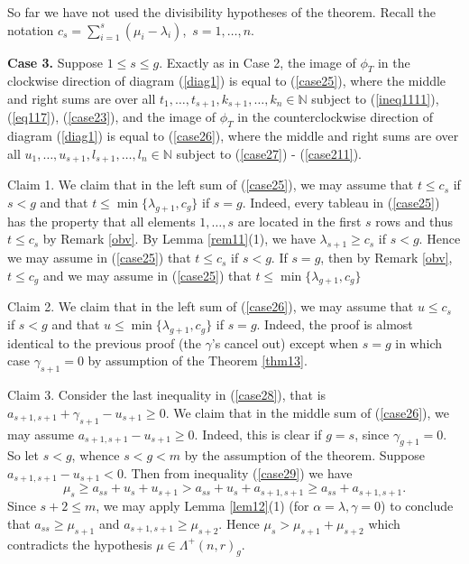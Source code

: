 \documentclass[ALCO,Unicode]{cedram}
\newcommand{\la}{\lambda}
\newcommand{\La}{\Lambda}
\numberwithin{equation}{section}
\begin{document}
So far we have not used the divisibility hypotheses of the theorem. Recall the notation $c_s= \sum_{i=1}^{s}(\mu_i - \lambda_i)$,\ $s=1,\dots,n$.

\textbf{Case 3.} Suppose $1 \le s \le g.$ Exactly as in Case 2, the image of $\phi_T$ in the clockwise direction of diagram (\ref{diag1}) is equal to (\ref{case25}), where the middle and right sums are over all  $t_1,\dots,t_{s+1},k_{s+1},\dots,k_n \in \mathbb{N}$ subject to (\ref{ineq1111}), (\ref{eq117}), (\ref{case23}), and the image of $\phi_T$ in the counterclockwise direction of diagram (\ref{diag1}) is equal to (\ref{case26}), where the middle and right sums are over all  $u_1,\dots,u_{s+1},l_{s+1},\dots,l_n \in \mathbb{N}$ subject to (\ref{case27}) - (\ref{case211}).

Claim 1. We claim that in the left sum of (\ref{case25}), we may assume that $t \le c_s$ if $s<g$ and that $t \le \min\{\lambda_{g+1}, c_g\}$ if $s=g$. Indeed, every tableau in  (\ref{case25}) has the property that all elements $1,\dots,s$ are located in the first $s$ rows and thus $t \le c_s$ by Remark \ref{obv}. By Lemma \ref{rem11}(1), we have $\la_{s+1} \ge c_s$ if $s<g$. Hence we may assume in (\ref{case25}) that $t \le c_s$ if $s<g$. If $s=g$, then by Remark \ref{obv}, $t \le c_g$ and we may assume in (\ref{case25}) that $t \le \min\{\lambda_{g+1}, c_g\}$

Claim 2. We claim that in the left sum of (\ref{case26}), we may assume that $u \le c_s$ if $s<g$ and that $u \le \min\{\lambda_{g+1}, c_g\}$ if $s=g$. Indeed, the proof is almost identical to the previous proof (the $\gamma$'s cancel out) except when $s=g$ in which case $\gamma_{s+1}=0$ by assumption of the Theorem \ref{thm13}.
 
 Claim 3. Consider the last inequality in (\ref{case28}), that is $a_{s+1,s+1}+\gamma_{s+1}-u_{s+1} \ge 0$.  We claim that in the middle sum of (\ref{case26}), we may assume $a_{s+1,s+1}-u_{s+1} \ge 0$. Indeed, this is clear if $g=s$, since $\gamma_{g+1}=0.$ So let $s<g$, whence $s<g<m$ by the assumption of the theorem. Suppose  $a_{s+1,s+1}-u_{s+1}<0$.  Then from inequality (\ref{case29}) we have
 \[\mu_s \ge a_{ss}+u_s+u_{s+1} > a_{ss}+u_s+a_{s+1, s+1} \ge a_{ss}+a_{s+1, s+1}.\]
 Since $s+2 \le m$, we may apply Lemma \ref{lem12}(1) (for $\alpha = \la, \gamma = 0$) to conclude that  $a_{ss} \ge \mu_{s+1}$ and $a_{s+1,s+1} \ge \mu_{s+2}$. Hence $\mu_s > \mu_{s+1}+\mu_{s+2}$ which contradicts the hypothesis $\mu \in \La^{+}(n,r)_g$.
 
\end{document}
